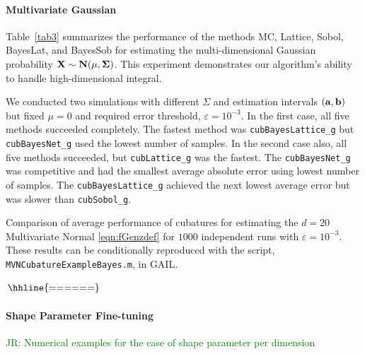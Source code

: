 \documentclass{svjour3}                     %
\newcommand{\code}[1]{\texttt{#1}}
\newcommand{\JRNote}[1]{{\textcolor{green}{JR: #1}}}
\begin{document}
{{{{{{\paragraph{Multivariate Gaussian}
Table~\ref{tab3} summarizes the performance of the methods MC, Lattice, Sobol,
BayesLat, and BayesSob for estimating the multi-dimensional Gaussian probability $\bf{X}\sim N(\bf{\mu},\Sigma)$. This experiment demonstrates our algorithm's ability to handle  high-dimensional integral.

We conducted two simulations with different $\Sigma$ and estimation intervals $(\bf{a}, \bf{b})$ but fixed $\mu=0$ and required error threshold, $\varepsilon=10^{-3}$. In the first case, all five methods succeeded completely. 
The fastest method was \code{cubBayesLattice\_g} but \code{cubBayesNet\_g} used the lowest number of samples.
In the second case also, all five methods succeeded,  but \code{cubLattice\_g} was the fastest. 
The \code{cubBayesNet\_g}  was competitive and had the smallest average absolute error using lowest number of samples. The \code{cubBayesLattice\_g} achieved the next lowest average error but was slower than \code{cubSobol\_g}.

\begin{table}[ht] %
\centering
\caption{Comparison of average performance of cubatures for estimating the $d=20$ Multivariate Normal \eqref{eqn:fGenzdef} for $1000$ independent runs with $\varepsilon=10^{-3}$. These results can be conditionally reproduced with the script, \code{MVNCubatureExampleBayes.m}, in GAIL. 
\label{tab3}}	   
$
\arraycolsep=1.4pt\def\arraystretch{0.9}
\begin{array}{l@{\quad}r@{\quad}r@{\quad}r@{\quad}r@{\quad}r@{\quad}r}
\hhline{======}
 
\end{array}
$
\end{table}


\clearpage









\paragraph{Shape Parameter Fine-tuning}

\JRNote{ Numerical examples for the case of shape parameter per dimension }

}}}}}}
\end{document}
